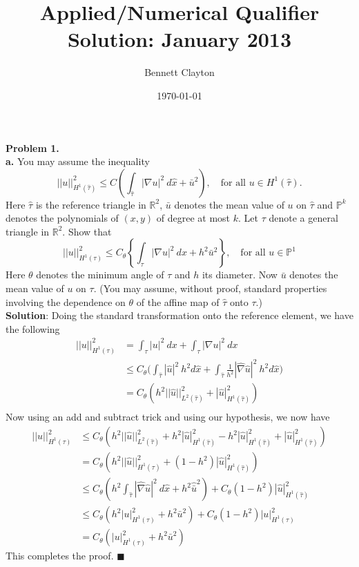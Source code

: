 \documentclass[11pt]{article}
\title{Applied/Numerical Qualifier Solution: January 2013}
\author{Bennett Clayton}
\affil{Texas A\&M University}
\date{\today}
\begin{document}
\maketitle

{\bf Problem 1.} 
\\[4pt]

{\bf a.} You may assume the inequality
\[ ||u||^2_{H^1(\hat{\tau})} \leq C\left( \int_{\hat{\tau}} |\nabla u|^2 \: d\hat{x} + \bar{u}^2 \right), \quad \text{for all } u \in H^1(\hat{\tau}). \]
Here $\hat{\tau}$ is the reference triangle in $\mathbb{R}^2$, $\bar{u}$ denotes the mean value of $u$ on $\hat{\tau}$ and $\mathbb{P}^k$ denotes the polynomials of $(x,y)$ of degree at most $k$. Let $\tau$ denote a general triangle in $\mathbb{R}^2$. Show that 
\[ ||u||^2_{H^1(\tau)} \leq C_\theta \left\{ \int_\tau |\nabla u|^2 \: dx + h^2\bar{u}^2 \right\}, \quad \text{for all } u \in \mathbb{P}^1 \]
Here $\theta$ denotes the minimum angle of $\tau$ and $h$ its diameter.  Now $\bar{u}$ denotes the mean value of $u$ on $\tau$. (You may assume, without proof, standard properties involving the dependence on $\theta$ of the affine map of $\hat{\tau}$ onto $\tau$.)
\\[8pt]

{\bf Solution}: Doing the standard transformation onto the reference element, we have the following
\begin{align*}
||u||_{H^1(\tau)}^2 &= \int_\tau |u|^2 \: dx + \int_\tau |\nabla u|^2 \: dx \\
&\leq C_\theta \big( \int_{\hat{\tau}} |\hat{u}|^2 \: h^2 d\hat{x} + \int_{\hat{\tau}} \frac{1}{h^2}| \hat{\nabla} \hat{u}|^2 \: h^2d\hat{x} \big) \\
&= C_\theta ( h^2||\hat{u}||^2_{L^2(\hat{\tau})} + |\hat{u}|^2_{H^1(\hat{\tau})} ) \\
\end{align*}
Now using an add and subtract trick and using our hypothesis, we now have 
\begin{align*}
||u||^2_{H^1(\tau)} &\leq C_\theta( h^2||\hat{u}||^2_{L^2(\hat{\tau})} + h^2|\hat{u}|^2_{H^1(\hat{\tau})} - h^2|\hat{u}|^2_{H^1(\hat{\tau})} + |\hat{u}|^2_{H^1(\hat{\tau})} ) \\
&= C_\theta( h^2 ||\hat{u}||^2_{H^1(\hat{\tau})} + (1-h^2)|\hat{u}|^2_{H^1(\hat{\tau})} ) \\
&\leq C_\theta ( h^2 \int_{\hat{\tau}} |\hat{\nabla} \hat{u}|^2 \: d\hat{x} + h^2 \hat{\bar{u}}^2) + C_\theta (1-h^2)|\hat{u}|^2_{H^1(\hat{\tau})} \\
&\leq C_\theta (h^2 |u|^2_{H^1(\tau)} + h^2\bar{u}^2) + C_\theta (1-h^2)|u|^2_{H^1(\tau)} \\
&= C_\theta (|u|^2_{H^1(\tau)} + h^2\bar{u}^2) 
\end{align*}
This completes the proof. $\blacksquare$
\end{document}
